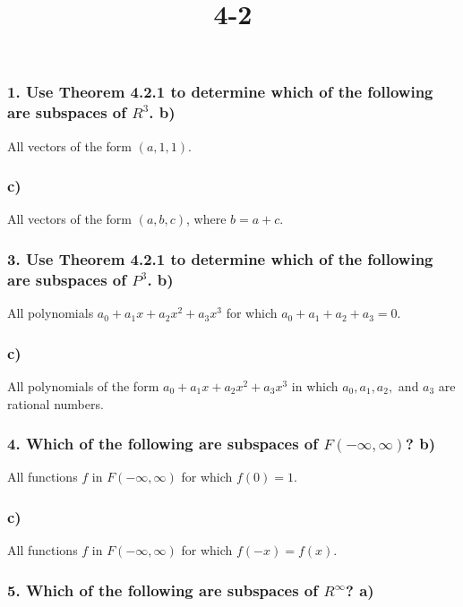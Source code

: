 \documentclass{article}
\title{ 4-2 }
\begin{document}
\maketitle
\pagebreak

\subsubsection*{ 1. Use Theorem 4.2.1 to determine which of the following are subspaces of $R^3$. b) }

All vectors of the form $(a, 1, 1)$.
\vfill

\subsubsection*{ c) }

All vectors of the form $(a, b, c)$, where $b = a + c$.
\vfill

\pagebreak
\subsubsection*{ 3. Use Theorem 4.2.1 to determine which of the following are subspaces of $P^3$. b) }

All polynomials $a_0 + a_1x + a_2x^2 + a_3x^3$ for which $a_0 + a_1 + a_2 + a_3 = 0$.
\vfill

\subsubsection*{ c) }

All polynomials of the form $a_0 + a_1x + a_2x^2 + a_3x^3$ in which $a_0, a_1, a_2,$ and $a_3$ are rational numbers.
\vfill

\pagebreak
\subsubsection*{ 4. Which of the following are subspaces of $F(-\infty, \infty)$? b) }

All functions $f$ in $F(-\infty, \infty)$ for which $f(0) = 1$.
\vfill

\subsubsection*{ c) }

All functions $f$ in $F(-\infty, \infty)$ for which $f(-x) = f(x)$.
\vfill

\pagebreak
\subsubsection*{ 5. Which of the following are subspaces of $R^{\infty}$? a) }
\end{document}
